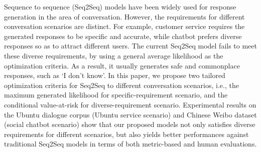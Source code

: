 Sequence to sequence (Seq2Seq) models have been widely used for response generation in the area of conversation. However, the requirements for different conversation scenarios are distinct. For example, customer service requires the generated responses to be specific and accurate, while chatbot prefers diverse responses so as to attract different users. The current Seq2Seq model fails to meet these diverse requirements, by using a general average likelihood as the optimization criteria. As a result, it usually generates safe and commonplace responses, such as ‘I don't know'. In this paper, we propose two tailored optimization criteria for Seq2Seq to different conversation scenarios, i.e., the maximum generated likelihood for specific-requirement scenario, and the conditional value-at-risk for diverse-requirement scenario. Experimental results on the Ubuntu dialogue corpus (Ubuntu service scenario) and Chinese Weibo dataset (social chatbot scenario) show that our proposed models not only satisfies diverse requirements for different scenarios, but also yields better performances against traditional Seq2Seq models in terms of both metric-based and human evaluations.
